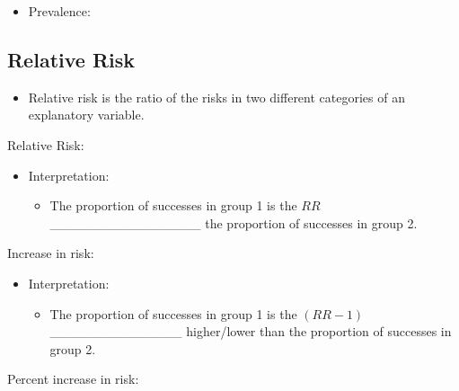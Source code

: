 \documentclass[
]{report}
\providecommand{\tightlist}{%
  \setlength{\itemsep}{0pt}\setlength{\parskip}{0pt}}
\begin{document}
\begin{itemize}
\tightlist
\item
  Prevalence:
\end{itemize}

\vspace{0.3in}

\hypertarget{relative-risk}{%
\subsection*{Relative Risk}\label{relative-risk}}

\begin{itemize}
\tightlist
\item
  Relative risk is the ratio of the risks in two different categories of an explanatory variable.
\end{itemize}

Relative Risk:

\vspace{0.3in}


\begin{itemize}
\item
  Interpretation:

  \begin{itemize}
  \tightlist
  \item
    The proportion of successes in group 1 is the \(RR\) \_\_\_\_\_\_\_\_\_\_\_\_\_\_\_\_ the proportion of successes in group 2.
  \end{itemize}
\end{itemize}

Increase in risk:

\vspace{0.3in}

\begin{itemize}
\item
  Interpretation:

  \begin{itemize}
  \tightlist
  \item
    The proportion of successes in group 1 is the \((RR-1)\) \_\_\_\_\_\_\_\_\_\_\_\_\_\_
    higher/lower than the proportion of successes in group 2.
  \end{itemize}
\end{itemize}

Percent increase in risk:

\vspace{0.3in}
\end{document}
